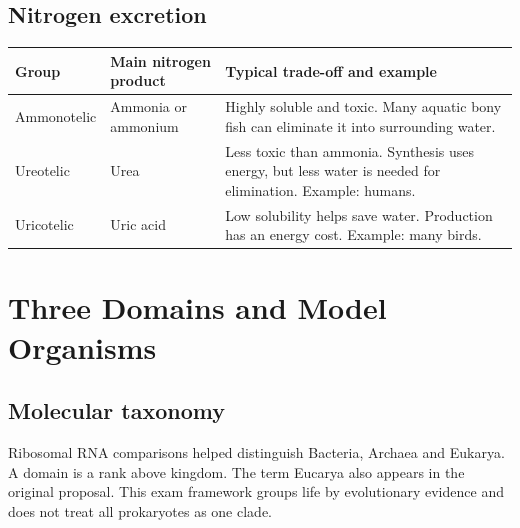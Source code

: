 \documentclass[12pt,a4paper]{article}
\begin{document}
\subsection{Nitrogen excretion}
\par\vspace{5pt}
\begingroup
\setlength{\extrarowheight}{1pt}
\noindent\begin{tabularx}{\linewidth}{|B{3.1cm}|Y|Y|}
\hline
\textbf{Group} & \textbf{Main nitrogen product} & \textbf{Typical trade-off and example} \\ \hline
Ammonotelic & Ammonia or ammonium & Highly soluble and toxic. Many aquatic bony fish can eliminate it into surrounding water. \\ \hline
Ureotelic & Urea & Less toxic than ammonia. Synthesis uses energy, but less water is needed for elimination. Example: humans. \\ \hline
Uricotelic & Uric acid & Low solubility helps save water. Production has an energy cost. Example: many birds. \\ \hline
\end{tabularx}\par
\endgroup
\section{Three Domains and Model Organisms}
\subsection{Molecular taxonomy}
\begin{tcolorbox}[defbox, title={Three-domain system}]
Ribosomal RNA comparisons helped distinguish Bacteria, Archaea and Eukarya. A domain is a rank above kingdom. The term Eucarya also appears in the original proposal. This exam framework groups life by evolutionary evidence and does not treat all prokaryotes as one clade.
\end{tcolorbox}

\begin{tcolorbox}[tikzbox, title={The three domain names}]
\centering
{}\par
\end{tcolorbox}
\end{document}
